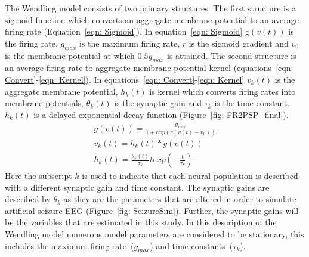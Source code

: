The Wendling model consists of two primary structures. The first structure is a sigmoid function which converts an aggregate membrane potential to an average firing rate (Equation~\ref{eqn: Sigmoid}). In equation~\ref{eqn: Sigmoid} $\mathrm{g}(v(t))$ is the firing rate, $g_{max}$ is the maximum firing rate, $r$ is the sigmoid gradient and $v_{0}$ is the membrane potential at which $0.5g_{max}$ is attained. The second structure is an average firing rate to aggregate membrane potential kernel (equations~\ref{eqn: Convert}-\ref{eqn: Kernel}). In equations~\ref{eqn: Convert}-\ref{eqn: Kernel} $v_k(t)$ is the aggregate membrane potential, $h_{k}(t)$ is kernel which converts firing rates into membrane potentials, $\theta_{k}(t)$ is the synaptic gain and $\tau_{k}$ is the time constant. $h_{k}(t)$ is a delayed exponential decay function (Figure~\ref{fig: FR2PSP_final}).\begin{align}%
\label{eqn: Sigmoid}
g(v(t)) = \frac{g_{max}}{1+exp(r(v(t)-v_{0}))}\\
\label{eqn: Convert}
v_{k}(t) = h_{k}(t)*g(v(t))\\
\label{eqn: Kernel} 
h_{k}(t) = \frac{\theta_{k}(t)}{\tau_{k}}texp\left(-\frac{t}{\tau_{k}}\right).
\end{align} Here the subscript $k$ is used to indicate that each neural population is described with a different synaptic gain and time constant. The synaptic gains are described by $\theta_{k}$ as they are the parameters that are altered in order to simulate artificial seizure EEG (Figure~\ref{fig: SeizureSim}). Further, the synaptic gains will be the variables that are estimated in this study. In this description of the Wendling model numerous model parameters are considered to be stationary, this includes the maximum firing rate~($g_{max}$) and time constants~($\tau_{k}$). 



